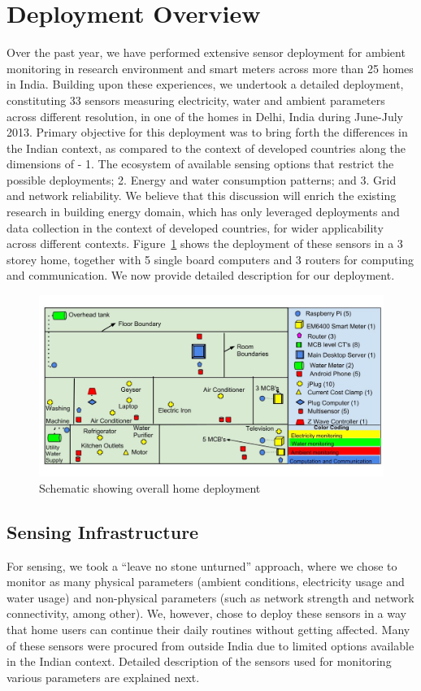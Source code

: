 \documentclass[10pt]{sensys-proc}
\newcommand{\figref}[1]{Figure~\ref{#1}}
\begin{document}
\section{Deployment Overview}
Over the past year, we have performed extensive sensor deployment for ambient monitoring in research environment and smart meters across more than 25 homes in India. Building upon these experiences, we undertook a detailed deployment, constituting 33 sensors measuring electricity, water and ambient parameters across different resolution, in one of the homes in Delhi, India during June-July 2013. Primary objective for this deployment was to bring forth the differences in the Indian context, as compared to the context of developed countries along the dimensions of - 1. The ecosystem of available sensing options that restrict the possible deployments; 2. Energy and water consumption patterns; and 3. Grid and network reliability. We believe that this discussion will enrich the existing research in building energy domain, which has only leveraged deployments and data collection in the context of developed countries, for wider applicability across different contexts. \figref{fig:overall} shows the deployment of these sensors in a 3 storey home, together with 5 single board computers and 3 routers for computing and communication. We now provide detailed description for our deployment.

\begin{figure} 
	\vspace{-5mm}    
    \includegraphics[scale=0.19]{./figures/overall_deployment.jpg}
    \vspace{-10mm}    
    \caption{Schematic showing overall home deployment}   
    \label{fig:overall}
\end{figure}

\subsection{Sensing Infrastructure}
\label{sec:sensing}
For sensing, we took a ``leave no stone unturned'' approach, where  we chose to monitor as many physical parameters (ambient conditions, electricity usage and water usage) and non-physical parameters (such as network strength and network connectivity, among other). We, however, chose to deploy these sensors in a way that home users can continue their daily routines without getting affected. Many of these sensors were procured from outside India due to limited options available in the Indian context. Detailed description of the sensors used for monitoring various parameters are explained next.
\end{document}
